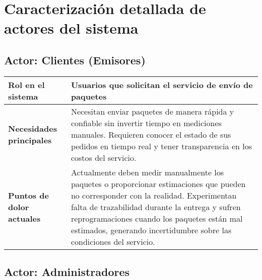 
\appendix

\chapter{Caracterización detallada de actores del sistema}
\label{anexo:actores}


\section*{Actor: Clientes (Emisores)}

\begin{table}[H]
\centering
\begin{tabular}{|p{4cm}|p{10cm}|}
\hline
\textbf{Rol en el sistema} & Usuarios que solicitan el servicio de envío de paquetes \\
\hline
\textbf{Necesidades principales} & Necesitan enviar paquetes de manera rápida y confiable sin invertir tiempo en mediciones manuales. Requieren conocer el estado de sus pedidos en tiempo real y tener transparencia en los costos del servicio. \\
\hline
\textbf{Puntos de dolor actuales} & Actualmente deben medir manualmente los paquetes o proporcionar estimaciones que pueden no corresponder con la realidad. Experimentan falta de trazabilidad durante la entrega y sufren reprogramaciones cuando los paquetes están mal estimados, generando incertidumbre sobre las condiciones del servicio. \\
\hline
\end{tabular}
\end{table}

\section*{Actor: Administradores}


